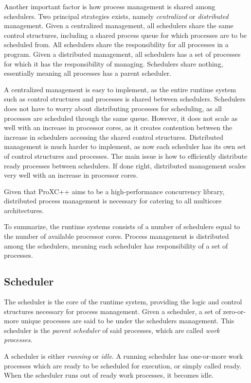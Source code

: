 Another important factor is how process management is shared among schedulers. Two principal strategies exists, namely \textit{centralized} or \textit{distributed} management. Given a centralized management, all schedulers share the same control structures, including a shared process queue for which processes are to be scheduled from. All schedulers share the responsibility for all processes in a program. Given a distributed management, all schedulers has a set of processes for which it has the responsibility of managing. Schedulers share nothing, essentially meaning all processes has a parent scheduler.

A centralized management is easy to implement, as the entire runtime system such as control structures and processes  is shared between schedulers. Schedulers does not have to worry about distributing processes for scheduling, as all processes are scheduled through the same queue. However, it does not scale as well with an increase in processor cores, as it creates contention between the increase in schedulers accessing the shared control structures. Distributed management is much harder to implement, as now each scheduler has its own set of control structures and processes. The main issue is how to efficiently distribute ready processes between schedulers. If done right, distributed management scales very well with an increase in processor cores.

Given that ProXC++ aims to be a high\hyp{}performance concurrency library, distributed process management is necessary for catering to all multicore architectures.

To summarize, the runtime systems consists of a number of schedulers equal to the number of available processor cores. Process management is distributed among the schedulers, meaning each scheduler has responsibility of a set of processes.


\subsection{Scheduler}


The scheduler is the core of the runtime system, providing the logic and control structures necessary for process management. Given a scheduler, a set of zero\hyp{}or\hyp{}more unique processes are said to be under the schedulers management. This scheduler is the \textit{parent scheduler} of said processes, which are called \textit{work processes}.

A scheduler is either \textit{running} or \textit{idle}. A running scheduler has one\hyp{}or\hyp{}more work processes which are ready to be scheduled for execution, or simply called ready. When the scheduler runs out of ready work processes, it becomes idle.

